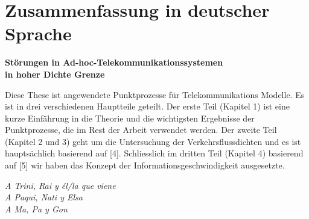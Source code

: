 \documentclass[11pt, english, singlespacing, headsepline, ]{MastersDoctoralThesis}
\theoremstyle{definition}
\begin{document}
 
\clearpage\pagestyle{empty}
\section*{Zusammenfassung in deutscher Sprache}

\begin{center}
\textbf{Störungen in Ad-hoc-Telekommunikationssystemen\\ in hoher Dichte Grenze}
\end{center}

Diese These ist angewendete Punktprozesse für Telekommunikations Modelle. Es ist in drei verschiedenen Hauptteile geteilt. 
Der erste Teil (Kapitel 1) ist eine kurze Einfährung in die Theorie und die wichtigsten Ergebnisse der Punktprozesse, die im Rest der Arbeit verwendet werden. Der zweite Teil (Kapitel 2 und 3) geht um die Untersuchung der Verkehrsflussdichten 
und es ist hauptsächlich basierend auf [4]. Schliesslich im dritten Teil (Kapitel 4) basierend auf [5] wir haben das Konzept
der Informationsgeschwindigkeit ausgesetzte.


\clearpage\pagestyle{empty}
\begin{flushleft}
\textit{A Trini, Rai y él/la que viene\\
A Paqui, Nati y Elsa\\
A Ma, Pa y Gon}
\end{flushleft}
\end{document}
